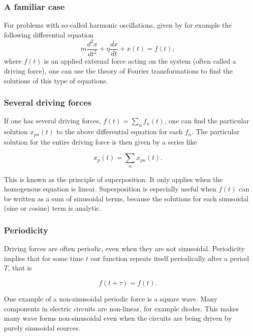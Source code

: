 \documentclass{beamer}
\begin{document}
\begin{frame}
\frametitle{A familiar case}

For problems with so-called harmonic oscillations, given by for example the following differential equation
\[
m\frac{d^2x}{dt^2}+\eta\frac{dx}{dt}+x(t)=f(t),
\]
where $f(t)$ is an applied external force acting on the system (often
called a driving force), one can use the theory of Fourier
transformations to find the solutions of this type of equations.
\end{frame}

\begin{frame}
\frametitle{Several driving forces}

If one has several driving forces, $f(t)=\sum_n f_n(t)$, one can find
the particular solution $x_{pn}(t)$ to the above differential equation for each $f_n$. The particular
solution for the entire driving force is then given by a series like

\[
x_p(t)=\sum_nx_{pn}(t).
\]

This is known as the principle of superposition. It only applies when
the homogenous equation is linear. 
Superposition is especially useful when $f(t)$ can be written
as a sum of sinusoidal terms, because the solutions for each
sinusoidal (sine or cosine)  term is analytic.
\end{frame}

\begin{frame}
\frametitle{Periodicity}

Driving forces are often periodic, even when they are not
sinusoidal. Periodicity implies that for some time $t$ our function repeats itself periodically after a period $T$, that is

\[
f(t+\tau)=f(t). 
\]

One example of a non-sinusoidal periodic force is a square wave. Many
components in electric circuits are non-linear, for example diodes. This 
makes many wave forms non-sinusoidal even when the circuits are being
driven by purely sinusoidal sources.
\end{frame}
\end{document}
